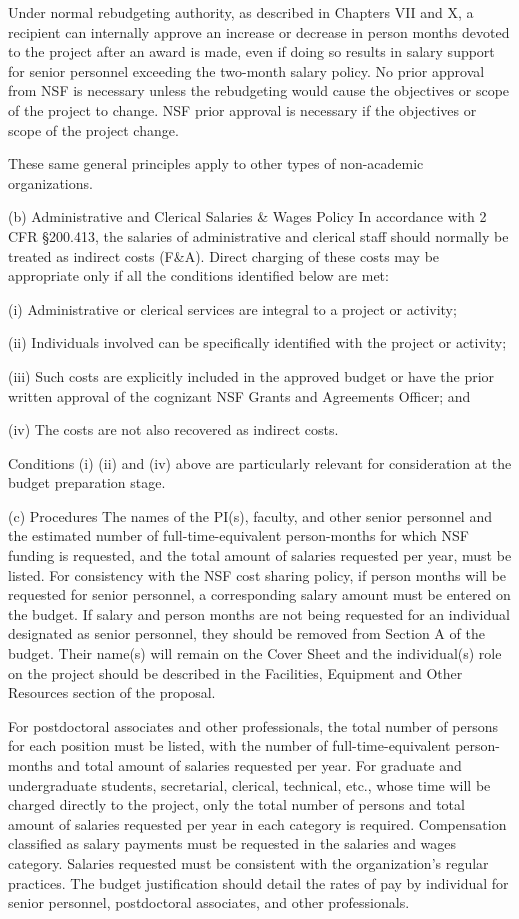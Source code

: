 {Under normal rebudgeting authority, as described in Chapters VII and X, a recipient can internally approve an increase or decrease in person months devoted to the project after an award is made, even if doing so results in salary support for senior personnel exceeding the two-month salary policy. No prior approval from NSF is necessary unless the rebudgeting would cause the objectives or scope of the project to change. NSF prior approval is necessary if the objectives or scope of the project change.

These same general principles apply to other types of non-academic organizations.

(b) Administrative and Clerical Salaries & Wages Policy
In accordance with 2 CFR §200.413, the salaries of administrative and clerical staff should normally be treated as indirect costs (F&A). Direct charging of these costs may be appropriate only if all the conditions identified below are met:

(i) Administrative or clerical services are integral to a project or activity;

(ii) Individuals involved can be specifically identified with the project or activity;

(iii) Such costs are explicitly included in the approved budget or have the prior written approval of the cognizant NSF Grants and Agreements Officer; and

(iv) The costs are not also recovered as indirect costs.

Conditions (i) (ii) and (iv) above are particularly relevant for consideration at the budget preparation stage.

(c) Procedures
The names of the PI(s), faculty, and other senior personnel and the estimated number of full-time-equivalent person-months for which NSF funding is requested, and the total amount of salaries requested per year, must be listed. For consistency with the NSF cost sharing policy, if person months will be requested for senior personnel, a corresponding salary amount must be entered on the budget. If salary and person months are not being requested for an individual designated as senior personnel, they should be removed from Section A of the budget. Their name(s) will remain on the Cover Sheet and the individual(s) role on the project should be described in the Facilities, Equipment and Other Resources section of the proposal.

For postdoctoral associates and other professionals, the total number of persons for each position must be listed, with the number of full-time-equivalent person-months and total amount of salaries requested per year. For graduate and undergraduate students, secretarial, clerical, technical, etc., whose time will be charged directly to the project, only the total number of persons and total amount of salaries requested per year in each category is required. Compensation classified as salary payments must be requested in the salaries and wages category. Salaries requested must be consistent with the organization’s regular practices. The budget justification should detail the rates of pay by individual for senior personnel, postdoctoral associates, and other professionals.

}
